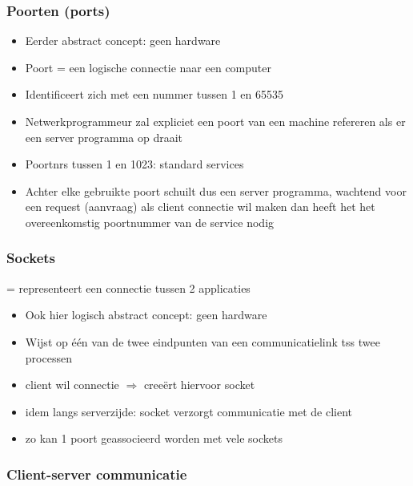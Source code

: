 \documentclass{article}
\begin{document}
\subsubsection{Poorten (ports)}

\begin{itemize}
    \item Eerder abstract concept: geen hardware
    \item Poort = een logische connectie naar een computer
    \item Identificeert zich met een nummer tussen 1 en 65535
    \item Netwerkprogrammeur zal expliciet een poort van een machine refereren als er een server programma op draait
    \item Poortnrs tussen 1 en 1023: standard services
    \item Achter elke gebruikte poort schuilt dus een server programma, wachtend voor een request (aanvraag) als client connectie wil maken dan heeft het het overeenkomstig poortnummer van de service nodig
\end{itemize}

\subsubsection{Sockets}

= representeert een connectie tussen 2 applicaties

\begin{itemize}
    \item Ook hier logisch abstract concept: geen hardware
    \item Wijst op één van de twee eindpunten van een communicatielink tss twee processen
    \item client wil connectie $\Rightarrow$ creeërt hiervoor socket
    \item idem langs serverzijde: socket verzorgt communicatie met de client
    \item zo kan 1 poort geassocieerd worden met vele sockets
\end{itemize}

\subsubsection{Client-server communicatie}
\end{document}
